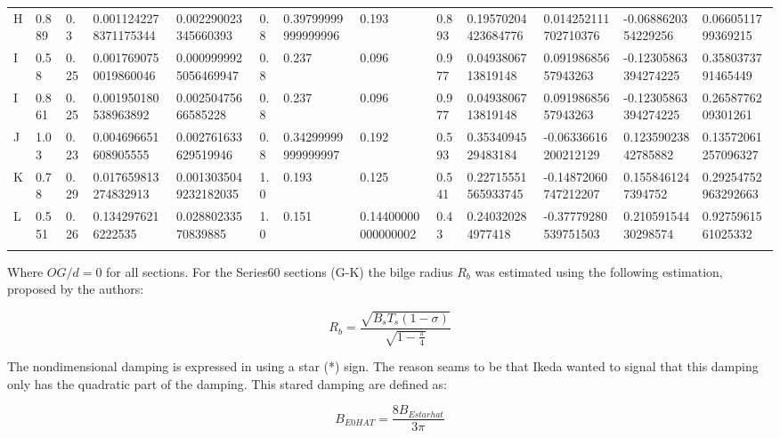 \begin{longtable}[c]{@{}lllllllllllll@{}}
H & 0.889 & 0.3 & 0.0011242278371175344 & 0.002290023345660393 & 0.8 & 0.39799999999999996 & 0.193 & 0.893 & 0.19570204423684776 & 0.014252111702710376 & -0.0688620354229256 & 0.0660511799369215\\\addlinespace 
I & 0.58 & 0.25 & 0.0017690750019860046 & 0.0009999925056469947 & 0.8 & 0.237 & 0.096 & 0.977 & 0.0493806713819148 & 0.09198685657943263 & -0.12305863394274225 & 0.3580373791465449\\\addlinespace 
I & 0.861 & 0.25 & 0.001950180538963892 & 0.00250475666585228 & 0.8 & 0.237 & 0.096 & 0.977 & 0.0493806713819148 & 0.09198685657943263 & -0.12305863394274225 & 0.2658776209301261\\\addlinespace 
J & 1.03 & 0.23 & 0.004696651608905555 & 0.002761633629519946 & 0.8 & 0.34299999999999997 & 0.192 & 0.593 & 0.3534094529483184 & -0.06336616200212129 & 0.12359023842785882 & 0.13572061257096327\\\addlinespace 
K & 0.78 & 0.29 & 0.017659813274832913 & 0.0013035049232182035 & 1.0 & 0.193 & 0.125 & 0.541 & 0.22715551565933745 & -0.14872060747212207 & 0.1558461247394752 & 0.29254752963292663\\\addlinespace 
L & 0.551 & 0.26 & 0.1342976216222535 & 0.02880233570839885 & 1.0 & 0.151 & 0.14400000000000002 & 0.43 & 0.240320284977418 & -0.37779280539751503 & 0.21059154430298574 & 0.9275961561025332\\\addlinespace 
\bottomrule 
 \end{longtable}

    

    Where \(OG/d=0\) for all sections. For the Series60 sections (G-K) the
bilge radius \(R_b\) was estimated using the following estimation,
proposed by the authors:
 
            
    
    \begin{equation}
R_{b} = \frac{\sqrt{B_{s} T_{s} \left(1 - \sigma\right)}}{\sqrt{1 - \frac{\pi}{4}}}
\label{eq:equation}
\end{equation}

    

    The nondimensional damping is expressed in \cite{7505983/4AFVVGNT} using
a star (*) sign. The reason seams to be that Ikeda wanted to signal that
this damping only has the quadratic part of the damping. This stared
damping are defined as:
 
            
    
    \begin{equation}
B_{E0 HAT} = \frac{8 B_{E star hat}}{3 \pi}
\label{eq:equation}
\end{equation}

